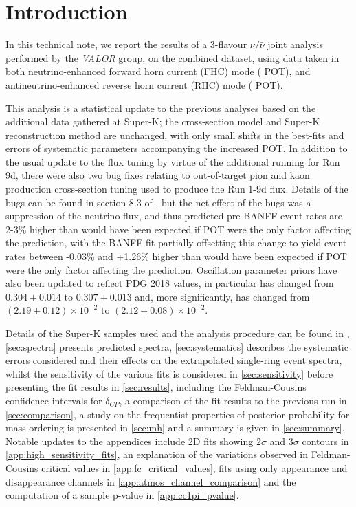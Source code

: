 
\section {Introduction}
\label{sec:intro}
In this technical note, we report the results of a 3-flavour $\nu/\bar{\nu}$ joint analysis performed by the {\em VALOR} group, on the combined \RunPeriod dataset, using data taken in both neutrino-enhanced forward horn current (FHC) mode (\TotalPotNu{} POT), and antineutrino-enhanced reverse horn current (RHC) mode (\TotalPotNuBar{} POT).

This analysis is a statistical update to the previous analyses based on the additional data gathered at Super-K; the cross-section model and Super-K reconstruction method are unchanged, with only small shifts in the best-fits and errors of systematic parameters accompanying the increased POT. In addition to the usual update to the flux tuning by virtue of the additional running for Run 9d, there were also two bug fixes relating to out-of-target pion and kaon production  cross-section tuning used to produce the Run 1-9d flux. Details of the bugs can be found in section 8.3 of \cite{FluxTuning13a_second}, but the net effect of the bugs was a suppression of the neutrino flux, and thus predicted pre-BANFF event rates are 2-3\% higher than would have been expected if POT were the only factor affecting the prediction, with the BANFF fit partially offsetting this change to yield event rates between -0.03\% and +1.26\% higher than would have been expected if POT were the only factor affecting the prediction. Oscillation parameter priors have also been updated to reflect PDG 2018 values, in particular \ssqthonetwo has changed from $0.304 \pm 0.014$ to $0.307 \pm 0.013$ and, more significantly, \ssqthonethree has changed from $(2.19 \pm 0.12)\times10^{-2}$ to $(2.12 \pm 0.08)\times10^{-2}$.

Details of the Super-K samples used and the analysis procedure can be found in \cite{OurRun18JointAnalysis3Flavour}, \cref{sec:spectra} presents predicted spectra, \cref{sec:systematics} describes the systematic errors considered and their effects on the extrapolated single-ring event spectra, whilst the sensitivity of the various fits is considered in \cref{sec:sensitivity} before presenting the fit results in \cref{sec:results}, including the Feldman-Cousins confidence intervals for $\delta_{CP}$, a comparison of the fit results to the previous run in \cref{sec:comparison}, \color{blue} a study on the frequentist properties of posterior probability for mass ordering is presented in \cref{sec:mh}\color{black} and a summary is given in \cref{sec:summary}. \color{blue} Notable updates to the appendices include 2D fits showing $2\sigma$ and $3\sigma$ contours in \cref{app:high_sensitivity_fits}, an explanation of the variations observed in Feldman-Cousins critical values in \cref{app:fc_critical_values}, \disappearance fits using only appearance and disappearance channels in \cref{app:atmos_channel_comparison} and the computation of a \nueCConepi sample p-value in \cref{app:cc1pi_pvalue}.\color{black}

\clearpage
